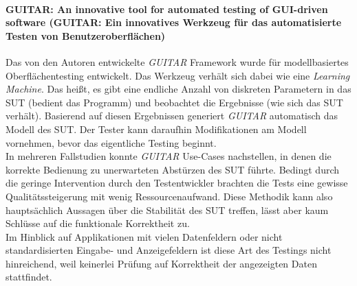 \paragraph{GUITAR: An innovative tool for automated testing of GUI-driven software  \cite{nguyen_guitar:_2014} (GUITAR: Ein innovatives Werkzeug für das automatisierte Testen von Benutzeroberflächen)} Das von den Autoren entwickelte \textit{GUITAR} Framework wurde für modellbasiertes Oberflächentesting entwickelt. Das Werkzeug verhält sich dabei wie eine \textit{Learning Machine}. Das heißt, es gibt eine endliche Anzahl von diskreten Parametern in das \Gls{SUT} (bedient das Programm) und beobachtet die Ergebnisse (wie sich das \Gls{SUT} verhält). Basierend auf diesen Ergebnissen generiert \textit{GUITAR} automatisch das Modell des SUT. Der Tester kann daraufhin Modifikationen am Modell vornehmen, bevor das eigentliche Testing beginnt.\\ 
In mehreren Fallstudien konnte \textit{GUITAR} Use-Cases nachstellen, in denen die korrekte Bedienung zu unerwarteten Abstürzen des \Gls{SUT} führte. Bedingt durch die geringe Intervention durch den Testentwickler brachten die Tests eine gewisse Qualitätssteigerung mit wenig Ressourcenaufwand. Diese Methodik kann also hauptsächlich Aussagen über die Stabilität des \Gls{SUT} treffen, lässt aber kaum Schlüsse auf die funktionale Korrektheit zu.\\
Im Hinblick auf Applikationen mit vielen Datenfeldern oder nicht standardisierten Eingabe- und Anzeigefeldern ist diese Art des Testings nicht hinreichend, weil keinerlei Prüfung auf Korrektheit der angezeigten Daten stattfindet.

